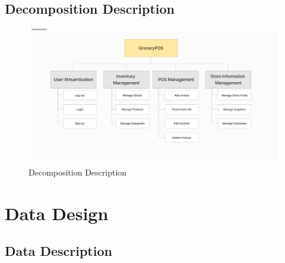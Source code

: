 \documentclass[../thesis.tex]{subfiles}
\begin{document}
\subsection{Decomposition Description}
\begin{figure}[H]
    \centering
    \includegraphics[width=1\textwidth]{images/Functional-Decomposition.png}
    \caption{Decomposition Description}
    \label{fig:functional-decomposition}
\end{figure}

\section{Data Design}
\subsection{Data Description}
\end{document}

